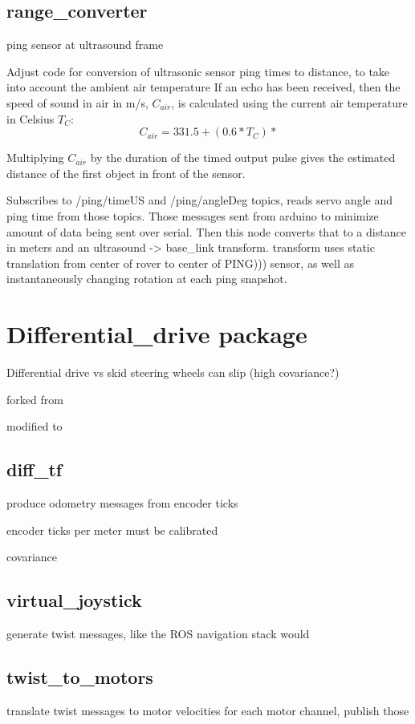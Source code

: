 \subsection{range\_converter}
ping sensor at ultrasound frame

Adjust code for conversion of ultrasonic sensor ping times to distance, to take into account the ambient air temperature
If an echo has been received, then the speed of sound in air in m/s, \(C_{air}\), is calculated using the current air temperature in Celsius \(T_C\):
\[C_{air} = 331.5 + (0.6 * T_C)*\]

Multiplying \(C_{air}\) by the duration of the timed output pulse gives the estimated distance of the first object in front of the sensor.

Subscribes to /ping/timeUS and /ping/angleDeg topics, reads servo angle and ping time from those topics. Those messages sent from arduino to minimize amount of data being sent over serial. Then this node converts that to a distance in meters and an ultrasound -> base\_link transform. transform uses static translation from center of rover to center of PING))) sensor, as well as instantaneously changing rotation at each ping snapshot.

\section{Differential\_drive package}

Differential drive vs skid steering
wheels can slip
(high covariance?)

forked from %

modified to 

\subsection{diff\_tf}
produce odometry messages from encoder ticks

encoder ticks per meter must be calibrated

covariance

\subsection{virtual\_joystick}
generate twist messages, like the ROS navigation stack would

\subsection{twist\_to\_motors}
translate twist messages to motor velocities for each motor channel, publish those


